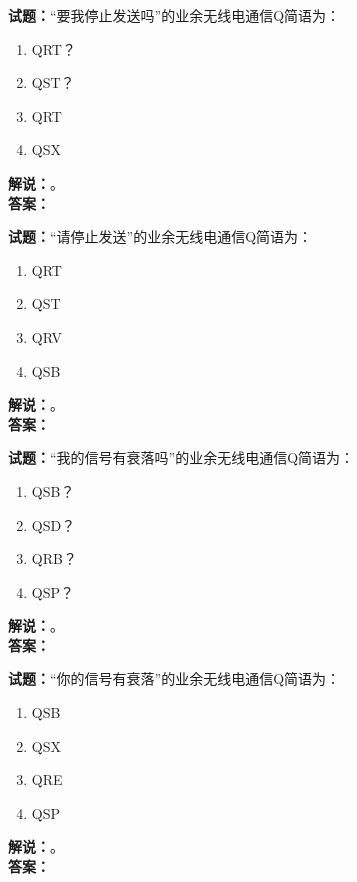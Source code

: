 \documentclass{ctexbook}
\begin{document}
\bigskip




\noindent\textbf{试题：}“要我停止发送吗”的业余无线电通信Q简语为：
\begin{enumerate}[leftmargin=3em]
\item QRT？
\item QST？
\item QRT
\item QSX
\end{enumerate}
\noindent\textbf{解说：}\textbf{}。\\\noindent\textbf{答案：}

\bigskip




\noindent\textbf{试题：}“请停止发送”的业余无线电通信Q简语为：
\begin{enumerate}[leftmargin=3em]
\item QRT
\item QST
\item QRV
\item QSB
\end{enumerate}
\noindent\textbf{解说：}\textbf{}。\\\noindent\textbf{答案：}

\bigskip




\noindent\textbf{试题：}“我的信号有衰落吗”的业余无线电通信Q简语为：
\begin{enumerate}[leftmargin=3em]
\item QSB？
\item QSD？
\item QRB？
\item QSP？
\end{enumerate}
\noindent\textbf{解说：}\textbf{}。\\\noindent\textbf{答案：}

\bigskip




\noindent\textbf{试题：}“你的信号有衰落”的业余无线电通信Q简语为：
\begin{enumerate}[leftmargin=3em]
\item QSB
\item QSX
\item QRE
\item QSP
\end{enumerate}
\noindent\textbf{解说：}\textbf{}。\\\noindent\textbf{答案：}

\bigskip
\end{document}
